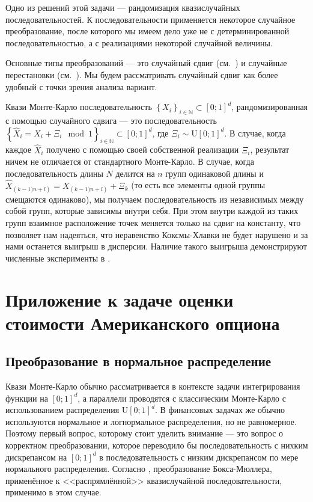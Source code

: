 \documentclass[specialist,
               substylefile = ../spbu.rtx,
               subf,href,colorlinks=true, 12pt]{disser}
\begin{document}
Одно из решений этой задачи --- рандомизация квазислучайных последовательностей. К последовательности применяется некоторое случайное преобразование, после которого мы имеем дело уже не с детерминированной последовательностью, а с реализациями некоторой случайной величины.

Основные типы преобразований --- это случайный сдвиг (см.~\cite{Tuffin2004}) и случайные перестановки (см.~\cite{Owen1995}). Мы будем рассматривать случайный сдвиг как более удобный с точки зрения анализа вариант.

Квази Монте-Карло последовательность $\left\{ X_i\right\}_{i \in \mathbb N} \subset \left[0;1\right]^d$, рандомизированная с помощью случайного сдвига --- это последовательность $\left\{ \hat X_i = X_i + \Xi_i \mod 1\right\}_{i \in \mathbb N} \subset \left[0;1\right]^d$, где $\Xi_i \sim \mathrm U\left[0;1\right]^d$. В случае, когда каждое $\hat X_i$ получено с помощью своей собственной реализации $\Xi_i$, результат ничем не отличается от стандартного Монте-Карло. В случае, когда последовательность длины $N$ делится на $n$ групп одинаковой длины и $\hat X_{\left(k - 1)n + l\right)} = X_{\left(k - 1)n + l\right)} + \Xi_k$ (то есть все элементы одной группы смещаются одинаково), мы получаем последовательность из независимых между собой групп, которые зависимы внутри себя. При этом внутри каждой из таких групп взаимное расположение точек меняется только на сдвиг на константу, что позволяет нам надеяться, что неравенство Коксмы-Хлавки не будет нарушено и за нами останется выигрыш в дисперсии. Наличие такого выигрыша демонстрируют численные эксперименты в \cite{Tuffin2004}.


\section{Приложение к задаче оценки стоимости Американского опциона} %
\label{sec:monte_carlo_in_option_pricing}

\subsection{Преобразование в нормальное распределение} %
\label{sub:uniform_normal_transform}

Квази Монте-Карло обычно рассматривается в контексте задачи интегрирования функции на $\left[0;1\right]^d$, а параллели проводятся с классическим Монте-Карло с использованием распределения $\mathrm U\left[0;1\right]^d$. В финансовых задачах же обычно используются нормальное и логнормальное распределения, но не равномерное. Поэтому первый вопрос, которому стоит уделить внимание --- это вопрос о корректном преобразовании, которое переводило бы последовательность с нихким дискрепансом на $\left[0;1\right]^d$ в последовательность с низким дискрепансом по мере нормального распределения. Согласно \cite{Oekten2011}, преобразование Бокса-Мюллера, применённое к <<распрямлённой>> квазислучайной последовательности, применимо в этом случае.
\end{document}
